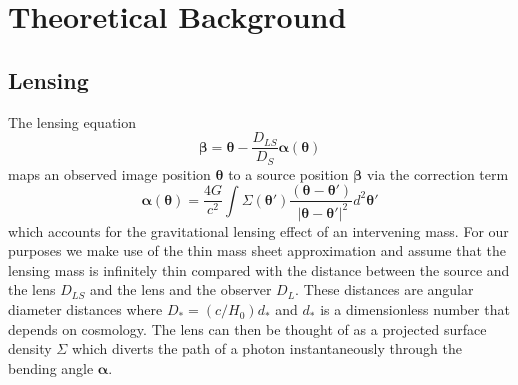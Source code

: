 \documentclass[onecolumn,galley]{mn2e}
\renewcommand{\vec}[1]{\ensuremath{\boldsymbol{#1}}}
\begin{document}



\section{Theoretical Background}

\subsection{Lensing}

The lensing equation
%
\begin{equation}
\vec\beta = \vec\theta - \frac{D_{LS}}{D_S}\vec\alpha(\vec\theta)
\label{lensing equation}
\end{equation}
%
maps an observed image position $\vec\theta$ to a source position $\vec\beta$
via the correction term 
%
\begin{equation}
\vec\alpha(\vec\theta) = \frac{4G}{c^2} \int \Sigma(\vec\theta')\frac{(\vec\theta - \vec\theta')}{\ |\vec\theta - \vec\theta'|^2}d^2\vec\theta'
\end{equation}
%
which accounts for the gravitational lensing effect of an intervening mass. For
our purposes we make use of the thin mass sheet approximation and assume that
the lensing mass is infinitely thin compared with the distance between the
source and the lens $D_{LS}$ and the lens and the observer $D_{L}$. These
distances are angular diameter distances where $D_* = (c/H_0)d_*$ and $d_*$ is
a dimensionless number that depends on cosmology.  The lens can then be thought
of as a projected surface density $\Sigma$ which diverts the path of a photon
instantaneously through the bending angle $\vec\alpha$.
\end{document}
